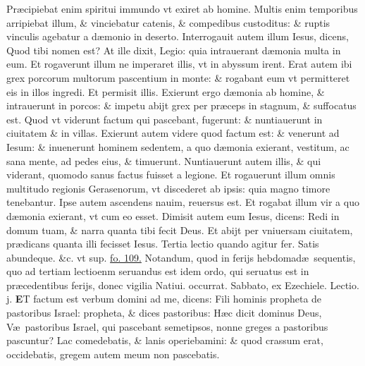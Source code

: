 \documentclass[a5paper,10pt]{book}
\def\leftmarginnote{%
	\lrmarginnote{\hskip -\marginparsep \hskip -6.5em}}
\def\ae{æ}
\begin{document}
\begin{multicols*}{2}
Pr\ae cipiebat enim spiritui immundo vt exiret ab homine.
Multis enim temporibus arripiebat illum, \& vinciebatur catenis, \& compedibus custoditus: \& ruptis vinculis agebatur a d\ae monio in deserto.
Interrogauit autem illum Iesus, dicens, Quod tibi nomen est? At ille dixit, Legio: quia intrauerant d\ae monia multa in eum.
Et rogaverunt illum ne imperaret illis, vt in abyssum irent.
Erat autem ibi grex porcorum multorum pascentium in monte: \& rogabant eum vt permitteret eis in illos ingredi.
Et permisit illis. Exierunt ergo d\ae monia ab homine, \& intrauerunt in porcos: \& impetu abijt grex per pr\ae ceps in stagnum, \& suffocatus est.
Quod vt viderunt factum qui pascebant, fugerunt: \& nuntiauerunt in ciuitatem \& in villas.
Exierunt autem videre quod factum est: \& venerunt ad Iesum: \& inuenerunt hominem sedentem, a quo d\ae monia exierant, vestitum, ac sana mente, ad pedes eius, \& timuerunt.
Nuntiauerunt autem illis, \& qui viderant, quomodo sanus factus fuisset a legione.
Et rogauerunt illum omnis multitudo regionis Gerasenorum, vt discederet ab ipsis: quia magno timore tenebantur.
Ipse autem ascendens nauim, reuersus est.
Et rogabat illum vir a quo d\ae monia exierant, vt cum eo esset.
Dimisit autem eum Iesus, dicens: Redi in domum tuam, \& narra quanta tibi fecit Deus.
Et abijt per vniuersam ciuitatem, pr\ae dicans quanta illi fecisset Iesus.
\newline \color{red} Tertia lectio quando agitur fer. \color{black} Satis abundeque. \&c. \color{red} vt sup. \color{black} \hyperlink{page.109}{fo. 109.}
\newline \color{red} Notandum, quod in ferijs hebdomad\ae \ sequentis, quo ad tertiam lectioenm seruandus est idem ordo, qui seruatus est in pr\ae cedentibus ferijs, donec vigilia Natiui. occurrat. \color{black}
\newline {} \color{red} \hypertarget{SAT-TERTIA-ADV}{Sabbato,} ex Ezechiele. \hfill Lectio. j. \color{black}
\vspace{-.25em}
\lettrine[lines=2]{\bfseries E}{}T\leftmarginnote{\begin{flushright}c. 34.\\a\end{flushright}} factum est verbum domini ad me, dicens: Fili hominis propheta de pastoribus Israel: propheta, \& dices pastoribus: H\ae c dicit dominus Deus, V\ae \ pastoribus
Israel, qui pascebant semetipsos, nonne greges a pastoribus pascuntur?
Lac comedebatis, \& lanis operiebamini: \& quod crassum erat, occidebatis, gregem autem meum non pascebatis.

\end{multicols*}
\end{document}
